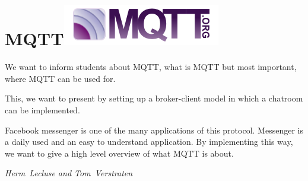 


\section*{MQTT\hfill\includegraphics[width=.5\linewidth]{images/mqttorg-glow.png}}
We want to inform students about MQTT, what is MQTT but most
important, where MQTT can be used for. 

This, we want to present by setting up a broker-client model in which
a chatroom can be implemented. 

Facebook messenger is one of the many applications of this protocol. Messenger is a daily used and an easy to understand application. 
By implementing this way, we want to give a high level overview of
what MQTT is about.

\hfill\textit{Herm~Lecluse and Tom~Verstraten}